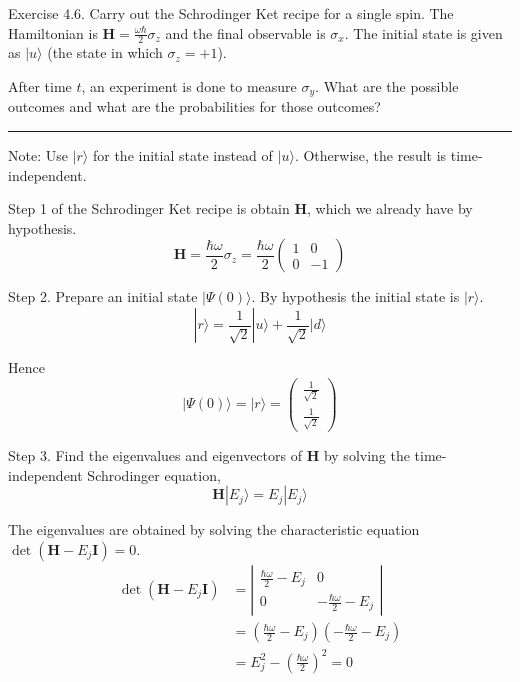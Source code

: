 \documentclass[12pt]{article}
\begin{document}
Exercise 4.6.
Carry out the Schrodinger Ket recipe for a
single spin.
The Hamiltonian is
$\mathbf H=\frac{\omega\hbar}{2}\sigma_z$ and the final
observable is $\sigma_x$.
The initial state is given as $|u\rangle$
(the state in which $\sigma_z=+1$).

\bigskip
After time $t$, an experiment is done to measure $\sigma_y$.
What are the possible outcomes and what are the probabilities
for those outcomes?

\bigskip
\hrule

\bigskip
Note: Use $|r\rangle$ for the initial state instead of $|u\rangle$.
Otherwise, the result is time-independent.

\bigskip
Step 1 of the Schrodinger Ket recipe is obtain $\mathbf H$,
which we already have by hypothesis.
\begin{equation*}
\mathbf H=\frac{\hbar\omega}{2}\sigma_z
=\frac{\hbar\omega}{2}\begin{pmatrix}1&0\\0&-1\end{pmatrix}
\end{equation*}

Step 2.
Prepare an initial state $|\Psi(0)\rangle$.
By hypothesis the initial state is $|r\rangle$.
\begin{equation*}
|r\rangle=\frac{1}{\sqrt2}|u\rangle+\frac{1}{\sqrt2}|d\rangle
\tag{2.5}
\end{equation*}

Hence
\begin{equation*}
|\Psi(0)\rangle=|r\rangle=\begin{pmatrix}\frac{1}{\sqrt2}\\[1ex]\frac{1}{\sqrt2}\end{pmatrix}
\end{equation*}

Step 3.
Find the eigenvalues and eigenvectors of $\mathbf H$ by solving
the time-independent Schrodinger equation,
\begin{equation*}
\mathbf H|E_j\rangle=E_j|E_j\rangle
\end{equation*}

The eigenvalues are obtained by solving the characteristic equation
$\det(\mathbf H-E_j\mathbf I)=0$.
\begin{align*}
\det(\mathbf H-E_j\mathbf I)
&=\left|
\begin{matrix}\frac{\hbar\omega}{2}-E_j&0\\0&-\frac{\hbar\omega}{2}-E_j\end{matrix}
\right|
\\[1ex]
&=\left(\frac{\hbar\omega}{2}-E_j\right)\left(-\frac{\hbar\omega}{2}-E_j\right)
\\[1ex]
&=E_j^2-\left(\frac{\hbar\omega}{2}\right)^2=0
\end{align*}
\end{document}

